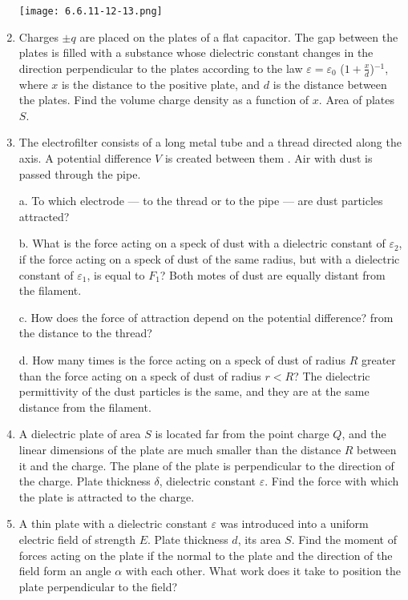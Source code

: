 \documentclass{article}
\begin{document}
\begin{enumerate}[label=6.6.\arabic*]
\begin{center}
    \texttt{[image: 6.6.11-12-13.png]}
\end{center}

\item Charges $\pm q$ are placed on the plates of a flat capacitor. The gap between the plates is filled with a substance whose dielectric constant changes in the direction perpendicular to the plates according to the law $\varepsilon = \varepsilon_0$ ($1 + \frac{x}{d}$)$^{-1}$, where $x$ is the distance to the positive plate, and $d$ is the distance between the plates. Find the volume charge density as a function of $x$. Area of plates $S$.

\item The electrofilter consists of a long metal tube and a thread directed along the axis. A potential difference $V$ is created between them . Air with dust is passed through the pipe. 

a. To which electrode — to the thread or to the pipe — are dust particles attracted? 

b. What is the force acting on a speck of dust with a dielectric constant of $\varepsilon_2$, if the force acting on a speck of dust of the same radius, but with a dielectric constant of $\varepsilon_1$, is equal to $F_1$? Both motes of dust are equally distant from the filament. 

c. How does the force of attraction depend on the potential difference? from the distance to the thread? 

d. How many times is the force acting on a speck of dust of radius $R$ greater than the force acting on a speck of dust of radius $r < R$? The dielectric permittivity of the dust particles is the same, and they are at the same distance from the filament.

\item A dielectric plate of area $S$ is located far from the point charge $Q$, and the linear dimensions of the plate are much smaller than the distance $R$ between it and the charge. The plane of the plate is perpendicular to the direction of the charge. Plate thickness $\delta$, dielectric constant $\varepsilon$. Find the force with which the plate is attracted to the charge.

\item A thin plate with a dielectric constant $\varepsilon$ was introduced into a uniform electric field of strength $E$. Plate thickness $d$, its area $S$. Find the moment of forces acting on the plate if the normal to the plate and the direction of the field form an angle $\alpha$ with each other. What work does it take to position the plate perpendicular to the field?


\end{enumerate}
\end{document}
